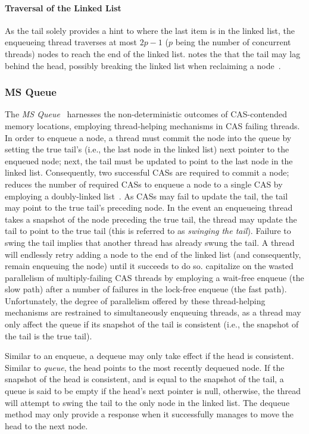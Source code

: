 \paragraph{Traversal of the Linked List}
As the tail solely provides a hint to where the last item is in the linked list,
the enqueueing thread traverses at most $2p-1$ ($p$ being the number of
concurrent threads) nodes to reach the end of the linked list. \citeauthor{michael1996simple} notes the
that the tail may lag behind the head, possibly breaking the linked list when
reclaiming a node~\citep{michael1996simple}.

\subsubsection{MS Queue}
The \emph{MS Queue}~\citep{michael1996simple} harnesses the non-deterministic
outcomes of CAS-contended memory locations, employing thread-helping mechanisms
in CAS failing threads. In order to enqueue a node, a thread must commit the
node into the queue by setting the true tail's (i.e., the last node in the linked list) next pointer to the enqueued
node; next, the tail must be updated to point to the last node in the linked
list. Consequently, two successful CASs are required to commit a node;
\citeauthor{ladan2008optimistic} reduces the number of required CASs to enqueue
a node to a single CAS by employing a doubly-linked
list~\citep{ladan2008optimistic}. As CASs may fail to update the tail, the tail
may point to the true tail's preceding node.
In the event an enqueueing thread takes a snapshot of the node preceding the
true tail, the thread may update the tail to point to the true tail (this is
referred to as \emph{swinging the tail}). Failure to swing the tail implies that
another thread has already swung the tail. A thread will endlessly retry adding
a node to the end of the linked list (and consequently, remain enqueuing the
node) until it succeeds to do so. \citeauthor{kogan2012methodology} capitalize on the wasted
parallelism of multiply-failing CAS threads by employing a wait-free enqueue
(the slow path) after a number of failures in the lock-free enqueue (the fast
path). Unfortunately, the degree of parallelism offered by these thread-helping
mechanisms are restrained to
simultaneously enqueuing threads, as a thread may only affect the queue if its
snapshot of the tail is consistent (i.e., the snapshot of the tail is the true
tail). 

Similar to an enqueue, a dequeue may only take effect if the head is
consistent. Similar to \emph{\citeauthor{valois1994queues} queue}, the head points to
the most recently dequeued node. If the snapshot of the head is consistent, and
is equal to the snapshot of the tail, a queue is said to be empty if the head's
next pointer is null, otherwise, the thread will attempt to swing the tail to
the only node in the linked list. The dequeue method may only provide a
response when it successfully manages to move the head to the next node.

